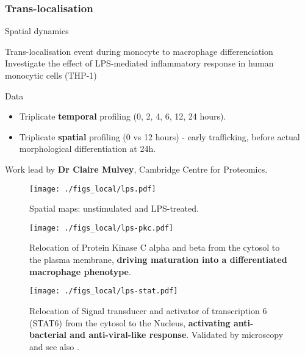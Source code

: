 \subsubsection{Trans-localisation}

\begin{frame}{Spatial dynamics}
  \begin{block}{Trans-localisation event during monocyte to macrophage
      differenciation}
    Investigate the effect of LPS-mediated inflammatory response in
    human monocytic cells (THP-1)
  \end{block}

  \begin{block}{Data}
    \begin{itemize}
    \item Triplicate \textbf{temporal} profiling (0, 2, 4, 6, 12, 24
      hours).
    \item Triplicate \textbf{spatial} profiling (0 vs 12 hours) -
      early trafficking, before actual morphological differentiation
      at 24h.
    \end{itemize}
  \end{block}

  Work lead by \textbf{Dr Claire Mulvey}, Cambridge Centre for
  Proteomics.
  
\end{frame}



\begin{frame}
  \begin{figure}[h]
    \centering
    \texttt{[image: ./figs\_local/lps.pdf]}
    \caption{Spatial maps: unstimulated and LPS-treated.}
  \end{figure}
\end{frame}

\begin{frame}
  \begin{figure}[h]
    \centering
    \texttt{[image: ./figs\_local/lps-pkc.pdf]}
    \caption{Relocation of Protein Kinase C alpha and beta from the
      cytosol to the plasma membrane, \textbf{driving maturation into
        a differentiated macrophage phenotype}.}
  \end{figure}
\end{frame}

\begin{frame}
  \begin{figure}[h]
    \centering
    \texttt{[image: ./figs\_local/lps-stat.pdf]}
    \caption{Relocation of Signal transducer and activator of
      transcription 6 (STAT6) from the cytosol to the Nucleus,
      \textbf{activating anti-bacterial and anti-viral-like
        response}. Validated by microscopy and see also
      \cite{Chen:2011}.}
  \end{figure}
\end{frame}



